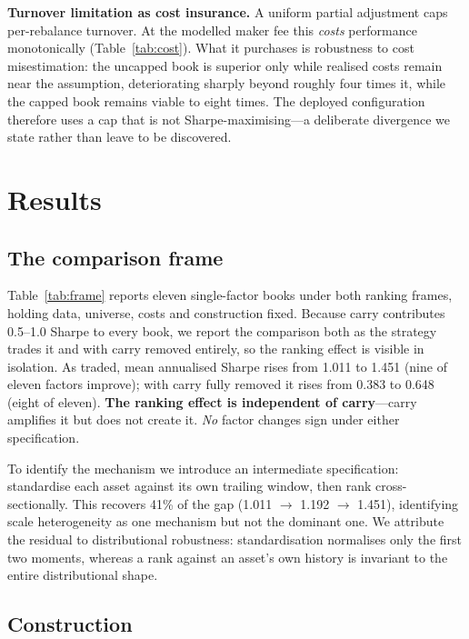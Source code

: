 \documentclass[11pt,letterpaper]{article}
\begin{document}
\textbf{Turnover limitation as cost insurance.} A uniform partial adjustment
caps per-rebalance turnover. At the modelled maker fee this \emph{costs}
performance monotonically (Table~\ref{tab:cost}). What it purchases is
robustness to cost misestimation: the uncapped book is superior only while
realised costs remain near the assumption, deteriorating sharply beyond roughly
four times it, while the capped book remains viable to eight times. The deployed
configuration therefore uses a cap that is not Sharpe-maximising---a deliberate
divergence we state rather than leave to be discovered.

\section{Results}

\subsection{The comparison frame}

Table~\ref{tab:frame} reports eleven single-factor books under both ranking
frames, holding data, universe, costs and construction fixed. Because carry
contributes 0.5--1.0 Sharpe to every book, we report the comparison both as the
strategy trades it and with carry removed entirely, so the ranking effect is
visible in isolation. As traded, mean annualised Sharpe rises from 1.011 to
1.451 (nine of eleven factors improve); with carry fully removed it rises from
0.383 to 0.648 (eight of eleven). \textbf{The ranking effect is independent of
carry}---carry amplifies it but does not create it. \emph{No} factor changes
sign under either specification.

To identify the mechanism we introduce an intermediate specification:
standardise each asset against its own trailing window, then rank
cross-sectionally. This recovers 41\% of the gap (1.011 $\rightarrow$ 1.192
$\rightarrow$ 1.451), identifying scale heterogeneity as one mechanism but not
the dominant one. We attribute the residual to distributional robustness:
standardisation normalises only the first two moments, whereas a rank against an
asset's own history is invariant to the entire distributional shape.

\subsection{Construction}
\end{document}
